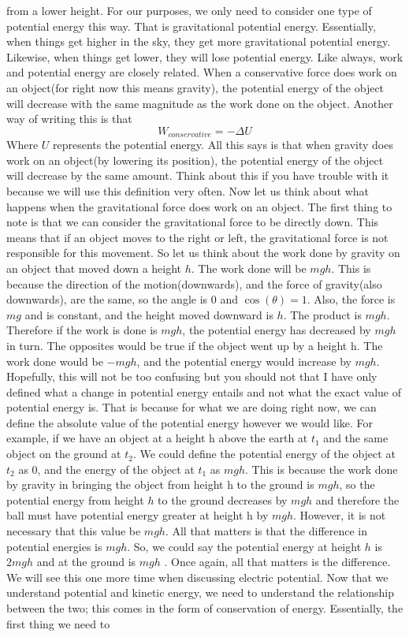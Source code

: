 \documentclass{article}[gray]
\numberwithin{equation}{subsection}
\begin{document}
from a lower height. For our purposes, we only need to consider one type of potential energy this way. That is gravitational potential energy. Essentially, when things get higher in the sky, they get more gravitational potential energy. Likewise, when things get lower, they will lose potential energy. Like always, work and potential energy are closely related. When a conservative force does work on an object(for right now this means gravity), the potential energy of the object will decrease with the same magnitude as the work done on the object. Another way of writing this is that \begin{equation}W_{conservative} = -\Delta U\end{equation} Where $U$ represents the potential energy. All this says is that when gravity does work on an object(by lowering its position), the potential energy of the object will decrease by the same amount. Think about this if you have trouble with it because we will use this definition very often. Now let us think about what happens when the gravitational force does work on an object. The first thing to note is that we can consider the gravitational force to be directly down. This means that if an object moves to the right or left, the gravitational force is not responsible for this movement. So let us think about the work done by gravity on an object that moved down a height $h$. The work done will be $mgh$. This is because the direction of the motion(downwards), and the force of gravity(also downwards), are the same, so the angle is 0 and $\cos\left(\theta \right)=1$. Also, the force is $mg$ and is constant, and the height moved downward is $h$. The product is $mgh$. Therefore if the work is done is $mgh$, the potential energy has decreased by $mgh$ in turn. The opposites would be true if the object went up by a height h. The work done would be $-mgh$, and the potential energy would increase by $mgh$. Hopefully, this will not be too confusing but you should not that I have only defined what a change in potential energy entails and not what the exact value of potential energy is. That is because for what we are doing right now, we can define the absolute value of the potential energy however we would like. For example, if we have an object at a height h above the earth at $t_1$ and the same object on the ground at $t_2$. We could define the potential energy of the object at $t_2$ as 0, and the energy of the object at $t_1$ as $mgh$. This is because the work done by gravity in bringing the object from height h to the ground is $mgh$, so the potential energy from height $h$ to the ground decreases by $mgh$ and therefore the ball must have potential energy greater at height h by $mgh$. However, it is not necessary that this value be $mgh$. All that matters is that the difference in potential energies is $mgh$. So, we could say the potential energy at height $h$ is $2mgh$ and at the ground is $mgh$ . Once again, all that matters is the difference. We will see this one more time when discussing electric potential. Now that we understand potential and kinetic energy, we need to understand the relationship between the two; this comes in the form of conservation of energy. Essentially, the first thing we need to 
\end{document}
